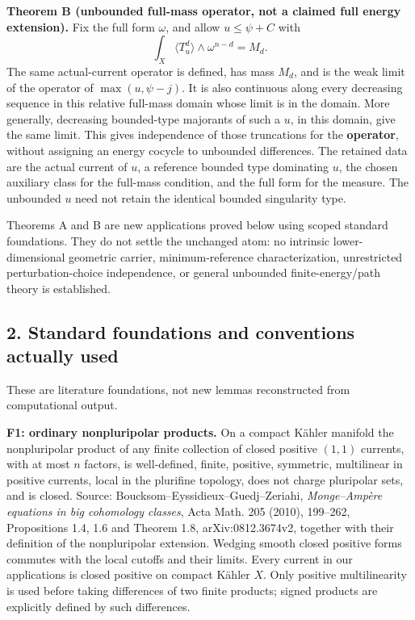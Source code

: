 \documentclass[
  10pt,
]{article}
\begin{document}
\textbf{Theorem B (unbounded full-mass operator, not a claimed full
energy extension).} Fix the full form \(\omega\), and allow
\(u\leq\psi+C\) with \[
\int_X\langle T_u^d\rangle\wedge\omega^{n-d}=M_d.
\] The same actual-current operator is defined, has mass \(M_d\), and is
the weak limit of the operator of \(\max(u,\psi-j)\). It is also
continuous along every decreasing sequence in this relative full-mass
domain whose limit is in the domain. More generally, decreasing
bounded-type majorants of such a \(u\), in this domain, give the same
limit. This gives independence of those truncations for the
\textbf{operator}, without assigning an energy cocycle to unbounded
differences. The retained data are the actual current of \(u\), a
reference bounded type dominating \(u\), the chosen auxiliary class for
the full-mass condition, and the full form for the measure. The
unbounded \(u\) need not retain the identical bounded singularity type.

Theorems A and B are new applications proved below using scoped standard
foundations. They do not settle the unchanged atom: no intrinsic
lower-dimensional geometric carrier, minimum-reference characterization,
unrestricted perturbation-choice independence, or general unbounded
finite-energy/path theory is established.

\subsection{2. Standard foundations and conventions actually
used}\label{standard-foundations-and-conventions-actually-used}

These are literature foundations, not new lemmas reconstructed from
computational output.

\textbf{F1: ordinary nonpluripolar products.} On a compact Kähler
manifold the nonpluripolar product of any finite collection of closed
positive \((1,1)\) currents, with at most \(n\) factors, is
well-defined, finite, positive, symmetric, multilinear in positive
currents, local in the plurifine topology, does not charge pluripolar
sets, and is closed. Source: Boucksom--Eyssidieux--Guedj--Zeriahi,
\emph{Monge--Ampère equations in big cohomology classes}, Acta Math. 205
(2010), 199--262, Propositions 1.4, 1.6 and Theorem 1.8,
arXiv:0812.3674v2, together with their definition of the nonpluripolar
extension. Wedging smooth closed positive forms commutes with the local
cutoffs and their limits. Every current in our applications is closed
positive on compact Kähler \(X\). Only positive multilinearity is used
before taking differences of two finite products; signed products are
explicitly defined by such differences.
\end{document}
